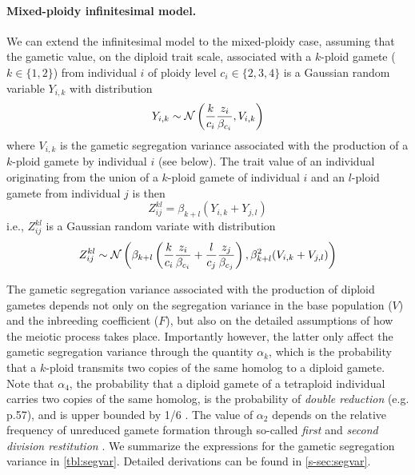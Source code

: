 \documentclass[12pt,a4paper]{article}
\begin{document}
\paragraph{Mixed-ploidy infinitesimal model.}

We can extend the infinitesimal model to the mixed-ploidy case, assuming that the
gametic value, on the diploid trait scale, associated with a $k$-ploid gamete ($k
\in \{1,2\}$) from individual $i$ of ploidy level $c_i \in \{2,3,4\}$ is a
Gaussian random variable $Y_{i,k}$ with distribution
\begin{equation}
    Y_{i,k} \sim \mathcal{N}\left(\frac{k}{c_i}\frac{z_i}{\beta_{c_i}}, V_{i,k}\right)
    \label{eq:gamete}
\end{equation}
where $V_{i,k}$ is the gametic segregation variance associated with the
production of a $k$-ploid gamete by individual $i$ (see below).
The trait value of an individual originating from the union of a $k$-ploid
gamete of individual $i$ and an $l$-ploid gamete from individual $j$ is then
  $$Z_{ij}^{kl} = \beta_{k+l}\left(Y_{i,k} + Y_{j,l}\right)$$
i.e., $Z_{ij}^{kl}$ is a Gaussian random variate with distribution
\begin{equation}
  Z_{ij}^{kl} \sim \mathcal{N}\left(
    \beta_{k+l} \left(
          \frac{k}{c_i}\frac{z_i}{\beta_{c_i}} 
        + \frac{l}{c_j}\frac{z_j}{\beta_{c_j}}\right), 
    \beta_{k+l}^2 (V_{i,k} + V_{j,l})\right)
   \label{eq:oneline}
\end{equation}

The gametic segregation variance associated with the production of diploid
gametes depends not only on the segregation variance in the base population
($V$) and the inbreeding coefficient ($F$), but also on the detailed
assumptions of how the meiotic process takes place.
Importantly however, the latter only affect the gametic segregation variance
through the quantity $\alpha_k$, which is the probability that a $k$-ploid
transmits two copies of the same homolog to a diploid gamete.
Note that $\alpha_4$, the probability that a diploid gamete of a tetraploid
individual carries two copies of the same homolog, is the probability of
\textit{double reduction} (e.g. \cite{lynch1998} p.57), and is upper bounded by
1/6 \citep{stift2008}.
The value of $\alpha_2$ depends on the relative frequency of unreduced gamete
formation through so-called \textit{first} and \textit{second division
restitution} \citep{bretagnolle1995,storme2013}.
We summarize the expressions for the gametic segregation variance in
\cref{tbl:segvar}.
Detailed derivations can be found in \cref{s-sec:segvar}.
\end{document}
